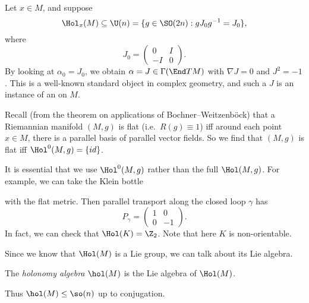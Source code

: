 \documentclass[a4paper]{article}
\begin{document}
\begin{eg}
  Let $x \in M$, and suppose
  \[
    \Hol_x(M) \subseteq \U(n) = \{g \in \SO(2n): g J_0 g^{-1} = J_0\},
  \]
  where
  \[
    J_0 =
    \begin{pmatrix}
      0 & I\\
      -I & 0
    \end{pmatrix}.
  \]
  By looking at $\alpha_0 = J_0$, we obtain $\alpha = J \in \Gamma(\End TM)$ with $\nabla J = 0$ and $J^2 = -1$. This is a well-known standard object in complex geometry, and such a $J$ is an instance of an  on $M$.
\end{eg}

\begin{eg}
  Recall (from the theorem on applications of Bochner--Weitzenb\"ock) that a Riemannian manifold $(M, g)$ is flat (i.e.\ $R(g) \equiv 1$) iff around each point $x \in M$, there is a parallel basis of parallel vector fields. So we find that $(M, g)$ is flat iff $\Hol^0(M, g) = \{id\}$.

  It is essential that we use $\Hol^0(M, g)$ rather than the full $\Hol(M, g)$. For example, we can take the Klein bottle
  \begin{center}
  \end{center}
  with the flat metric. Then parallel transport along the closed loop $\gamma$ has
  \[
    P_\gamma =
    \begin{pmatrix}
      1 & 0\\
      0 & -1
    \end{pmatrix}.
  \]
  In fact, we can check that $\Hol(K) = \Z_2$. Note that here $K$ is non-orientable.
\end{eg}

Since we know that $\Hol(M)$ is a Lie group, we can talk about its Lie algebra.

\begin{defi}
  The \emph{holonomy algebra} $\hol(M)$ is the Lie algebra of $\Hol(M)$.
\end{defi}

Thus $\hol(M) \leq \so(n)$ up to conjugation.
\end{document}
